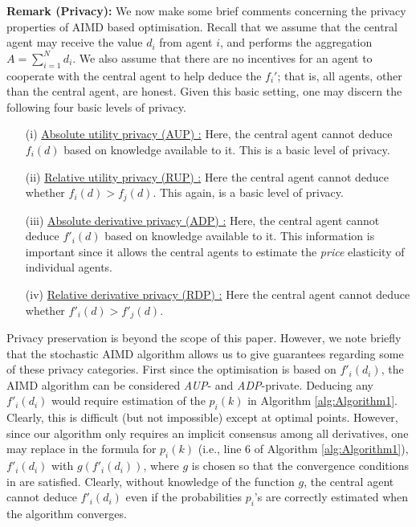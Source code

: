 \documentclass[journal]{IEEEtran}
\begin{document}
\noindent \textbf{Remark (Privacy):} We now make some brief comments concerning the privacy properties of AIMD based optimisation. Recall that we assume that the central agent may receive the value $d_i$ from agent $i$, and performs the aggregation $A = \sum_{i=1}^{N} d_i$. We also assume that there are no incentives for an agent to cooperate with the central agent to help deduce the $f_i'$; that is, all agents, other than the central agent, are honest.  Given this basic setting, one may discern the following four basic levels of privacy.
\begin{itemize}
	\item[(i)] \underline{Absolute utility privacy (AUP) :} Here, the central agent cannot deduce $f_i(d)$ based on knowledge available to it. This is a basic level of privacy.
	\item[(ii)] \underline{Relative utility privacy (RUP) :} Here the central agent cannot deduce whether  $f_i(d) > f_j(d)$. This again, is a basic level of privacy. 
	\item[(iii)] \underline{Absolute derivative privacy (ADP) :} Here, the central agent cannot deduce $f'_i(d)$ based on knowledge available to it. This information is important since it allows the central agents to estimate the {\em price} elasticity of individual agents.
	\item[(iv)] \underline{Relative derivative privacy (RDP) :} Here the central agent cannot deduce whether  $f'_i(d) > f'_j(d)$.
\end{itemize}
Privacy preservation is beyond the scope of this paper. However, we note briefly that the stochastic AIMD algorithm allows us to give  guarantees regarding some of these privacy categories. First since the optimisation is based on $f'_i(d_i)$, the AIMD algorithm can be considered \emph{AUP}- and \emph{ADP}-private. Deducing any $f'_i(d_i)$ would require estimation of the $p_i(k)$ in Algorithm \ref{alg:Algorithm1}. Clearly, this is difficult (but not impossible) except at optimal points. However, since our algorithm only requires an implicit consensus among all derivatives, one may replace in the formula for $p_i(k)$ (i.e., line 6 of Algorithm \ref{alg:Algorithm1}), $f'_i(d_i)$ with $g(f'_i(d_i))$, where $g$ is chosen so that the convergence conditions in \cite{wirth2014nonhomogeneous} are satisfied. Clearly, without knowledge of the function $g$, the central agent cannot deduce $f'_i(d_i)$ even if the probabilities $p_i$'s are correctly estimated when the algorithm converges. 
\end{document}
